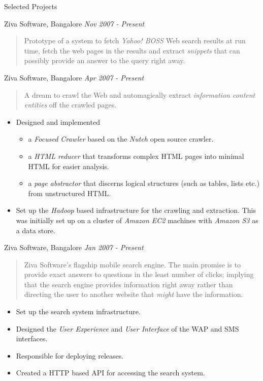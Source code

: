 \documentclass{resume}
\newcommand{\period}{\hfill\small\sl}
\begin{document}
\begin{category}{Selected Projects}

     Ziva Software, Bangalore {\period Nov 2007 - Present}
    \begin{quote}
        Prototype of a system to fetch {\em Yahoo! BOSS} Web search results at run time, fetch the web pages in the results and extract {\em snippets} that can possibly provide an answer to the query right away.
    \end{quote}

     Ziva Software, Bangalore {\period Apr 2007 - Present}
    \begin{quote}
        A dream to crawl the Web and automagically extract {\em information content entities} off the crawled pages.
    \end{quote}
    \begin{itemize}
        \item Designed and implemented
            \begin{itemize}
                \item a {\em Focused Crawler} based on the {\em Nutch} open source crawler.
                \item a {\em HTML reducer} that transforms complex HTML pages into minimal HTML for easier analysis.
                \item a {\em page abstractor} that discerns logical structures (such as tables, lists etc.) from unstructured HTML.
            \end{itemize}
        \item Set up the {\em Hadoop} based infrastructure for the crawling and extraction.
            This was initially set up on a cluster of {\em Amazon EC2} machines with {\em Amazon S3} as a data store.
    \end{itemize}

     Ziva Software, Bangalore {\period Jan 2007 - Present}
    \begin{quote}
        Ziva Software's flagship mobile search engine. The main promise is to provide exact answers to questions in the least number of clicks; implying that the search engine provides information right away rather than directing the user to another website that {\em might} have the information.
    \end{quote}
    \begin{itemize}
        \item Set up the search system infrastructure.
        \item Designed the {\em User Experience} and {\em User Interface} of the WAP and SMS interfaces.
        \item Responsible for deploying releases.
        \item Created a HTTP based API for accessing the search system.
    \end{itemize}


\end{category}
\end{document}
